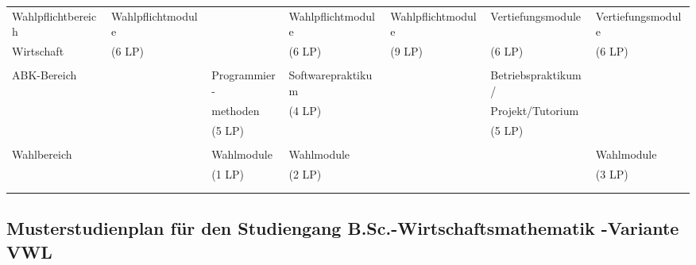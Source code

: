\begin{center}
\begin{tabular}{||l||l|l|l|l|l|l||}
\hhline{|:=::=|=|=|=|=|=:|} Wahlpflichtbereich&Wahlpflichtmodule&&Wahlpflichtmodule &Wahlpflichtmodule&Vertiefungsmodule&Vertiefungsmodule \\
\hhline{||~||~|~|~|~|~|~||} Wirtschaft&(6 LP)&&(6 LP)&(9 LP)&(6 LP)&(6 LP)\\
\hhline{||~||~|~|~|~|~|~||} &&&&&&\\
\hhline{|:=::======:|} ABK-Bereich&&Programmier-&Softwarepraktikum&&Betriebspraktikum/& \\
\hhline{||~||~|~|~|~|~|~||} &&methoden&(4 LP)&&Projekt/Tutorium&\\
\hhline{||~||~|~|~|~|~|~||} &&(5 LP)&&&(5 LP)&\\
\hhline{||~||~|~|~|~|~|~||} &&&&&&\\
\hhline{|:=::======:|} Wahlbereich&&Wahlmodule&Wahlmodule&&&Wahlmodule\\
\hhline{||~||~|~|~|~|~|~||} &&(1 LP)&(2 LP)&&&(3 LP)\\
\hhline{||~||~|~|~|~|~|~||} &&&&&&\\
\hhline{|b:=:b:======:b|}
\end{tabular}
\end{center}

\clearpage

\subsection{Musterstudienplan für den Studiengang B.Sc.-Wirtschaftsmathematik -Variante VWL}

